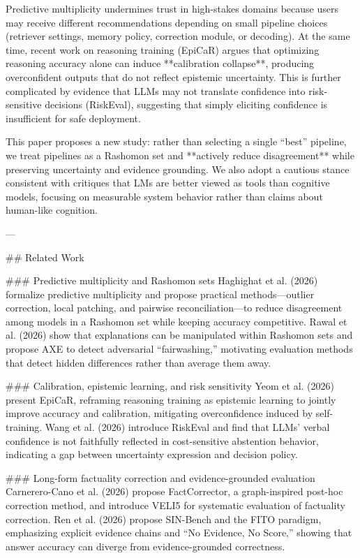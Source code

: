 Predictive multiplicity undermines trust in high-stakes domains because users may receive different recommendations depending on small pipeline choices (retriever settings, memory policy, correction module, or decoding). At the same time, recent work on reasoning training (EpiCaR) argues that optimizing reasoning accuracy alone can induce **calibration collapse**, producing overconfident outputs that do not reflect epistemic uncertainty. This is further complicated by evidence that LLMs may not translate confidence into risk-sensitive decisions (RiskEval), suggesting that simply eliciting confidence is insufficient for safe deployment.

This paper proposes a new study: rather than selecting a single “best” pipeline, we treat pipelines as a Rashomon set and **actively reduce disagreement** while preserving uncertainty and evidence grounding. We also adopt a cautious stance consistent with critiques that LMs are better viewed as tools than cognitive models, focusing on measurable system behavior rather than claims about human-like cognition.

---

## Related Work  

### Predictive multiplicity and Rashomon sets  
Haghighat et al. (2026) formalize predictive multiplicity and propose practical methods—outlier correction, local patching, and pairwise reconciliation—to reduce disagreement among models in a Rashomon set while keeping accuracy competitive. Rawal et al. (2026) show that explanations can be manipulated within Rashomon sets and propose AXE to detect adversarial “fairwashing,” motivating evaluation methods that detect hidden differences rather than average them away.

### Calibration, epistemic learning, and risk sensitivity  
Yeom et al. (2026) present EpiCaR, reframing reasoning training as epistemic learning to jointly improve accuracy and calibration, mitigating overconfidence induced by self-training. Wang et al. (2026) introduce RiskEval and find that LLMs’ verbal confidence is not faithfully reflected in cost-sensitive abstention behavior, indicating a gap between uncertainty expression and decision policy.

### Long-form factuality correction and evidence-grounded evaluation  
Carnerero-Cano et al. (2026) propose FactCorrector, a graph-inspired post-hoc correction method, and introduce VELI5 for systematic evaluation of factuality correction. Ren et al. (2026) propose SIN-Bench and the FITO paradigm, emphasizing explicit evidence chains and “No Evidence, No Score,” showing that answer accuracy can diverge from evidence-grounded correctness.

